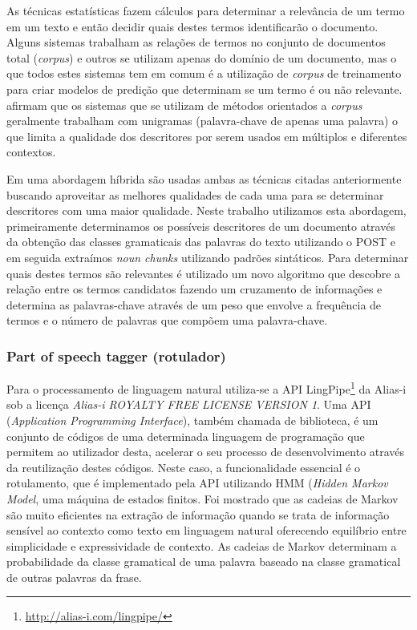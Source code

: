 As técnicas estatísticas fazem cálculos para determinar a relevância de um termo em um texto e então decidir quais destes termos identificarão o documento. Alguns sistemas trabalham as relações de termos no conjunto de documentos total (\emph{corpus}) e outros se utilizam apenas do domínio de um documento, mas o que todos estes sistemas tem em comum é a utilização de \emph{corpus} de treinamento para criar modelos de predição que determinam se um termo é ou não relevante. \cite{Berry2010} afirmam que os sistemas que se utilizam de métodos orientados a \emph{corpus} geralmente trabalham com unigramas (palavra-chave de apenas uma palavra) o que limita a qualidade dos descritores por serem usados em múltiplos e diferentes contextos.

Em uma abordagem híbrida são usadas ambas as técnicas citadas anteriormente buscando aproveitar as melhores qualidades de cada uma para se determinar descritores com uma maior qualidade. Neste trabalho utilizamos esta abordagem, primeiramente determinamos os possíveis descritores de um documento através da obtenção das classes gramaticais das palavras do texto utilizando o POST e em seguida extraímos \emph{noun chunks} utilizando padrões sintáticos. Para determinar quais destes termos são relevantes é utilizado um novo algoritmo que descobre a relação entre os termos candidatos fazendo um cruzamento de informações e determina as palavras-chave através de um peso que envolve a frequência de termos e o número de palavras que compõem uma palavra-chave.

\subsubsection{Part of speech tagger (rotulador)}
Para o processamento de linguagem natural utiliza-se a API LingPipe\footnote{\href{http://alias-i.com/lingpipe/}{http://alias-i.com/lingpipe/}} da Alias-i sob a licença \emph{Alias-i ROYALTY FREE LICENSE VERSION 1}. Uma API (\emph{Application Programming Interface}), também chamada de biblioteca, é um conjunto de códigos de uma determinada linguagem de programação que permitem ao utilizador desta, acelerar o seu processo de desenvolvimento através da reutilização destes códigos. Neste caso, a funcionalidade essencial é o rotulamento, que é implementado pela API utilizando HMM (\emph{Hidden Markov Model}, uma máquina de estados finitos. Foi mostrado que as cadeias de Markov são muito eficientes na extração de informação quando se trata de informação sensível ao contexto como texto em linguagem natural oferecendo equilíbrio entre simplicidade e expressividade de contexto\cite{Freitag2000}. As cadeias de Markov determinam a probabilidade da classe gramatical de uma palavra baseado na classe gramatical de outras palavras da frase.

